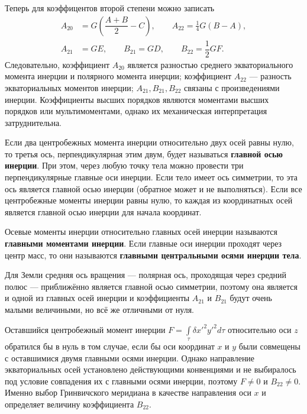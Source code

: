 \documentclass[11pt, a4paper,addpoints]{exam}
\theoremstyle{remark}
\begin{document}
    Теперь для коэффицентов второй степени можно записать
    \begin{align*}
        A_{20} &= G\left( \dfrac{A + B}{2} - C \right), \qquad
        A_{22} = \frac{1}{4}G\left( B - A \right), \\
        A_{21} &= GE,  \qquad
        B_{21} = GD,  \qquad
        B_{22} = \dfrac{1}{2}GF.
    \end{align*}
    Следовательно, коэффициент $A_{20}$ является разностью среднего экваториального момента инерции
    и полярного момента инерции; коэффициент $A_{22}$ --- разность экваториальных моментов инерции;
    $A_{21}, B_{21}, B_{22}$ связаны с произведениями инерции. Коэффициенты высших порядков являются
    моментами высших порядков или мультимоментами, однако их механическая интерпретация
    затруднительна.

    Если два центробежных момента инерции относительно двух осей равны нулю, то третья ось,
    перпендикулярная этим двум, будет называться \textbf{главной осью инерции}. При этом, через
    любую точку тела можно провести три перпендикулярные главные оси инерции. Если тело имеет ось
    симметрии, то эта ось является главной осью инерции (обратное может и не выполняться).
    Если все центробежные моменты инерции равны нулю, то каждая из координатных осей является
    главной осью инерции для начала координат.

    Осевые моменты инерции относительно главных осей инерции называются \textbf{главными моментами
    инерции}. Если главные оси инерции проходят через центр масс, то они называются \textbf{главными
    центральными осями инерции тела}.

    Для Земли средняя ось вращения --- полярная ось, проходящая через средний полюс --- 
    приближённо является главной осью симметрии, поэтому она является и одной из главных осей
    инерции и коэффициенты $A_{21}$ и $B_{21}$ будут очень малыми величиными, но всё же отличными от
    нуля.

    Оставшийся центробежный момент инерции $F = \int\limits_\tau \delta x'^2 y'^2 d\tau$
    относительно оси $z$ обратился бы  в нуль  в том случае, если бы оси координат $x$ и $y$
    были совмещены с оставшимися двумя главными осями инерции. Однако направление экваториальных осей
    установлено действующими конвенциями и не выбиралось под условие совпадения их с главными осями
    инерции, поэтому $F \neq 0$ и $B_{22} \neq 0$. Именно выбор Гринвичского меридиана в качестве
    направления оси $x$ и определяет величину коэффициента $B_{22}$.
\end{document}
